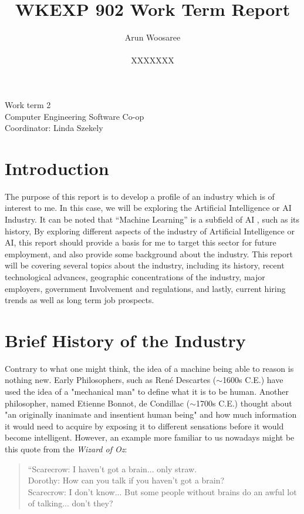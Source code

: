 \documentclass[letterpaper,12pt]{article}
\title{WKEXP 902 Work Term Report}
\author{Arun Woosaree \\ \\ XXXXXXX}
\begin{document}
\relax
\begin{titlepage}
 \maketitle
 \thispagestyle{empty} %
 \centering
 \large
 \vspace{1cm}
 Work term 2\\
 \vspace{1cm}
 Computer Engineering Software Co-op \\
 \vspace{1cm}
 Coordinator: Linda Szekely
\end{titlepage}

\section{Introduction}
The purpose of this report is to develop a profile of an industry which is of interest to me.
In this case, we will be exploring the Artificial Intelligence or AI Industry.
It can be noted that ``Machine Learning'' is a subfield of AI \cite{sasAIvsML}, such as its history, 
By exploring different aspects of the industry of Artificial Intelligence or AI, this report should
provide a basis for me to target this sector for future employment, and
also provide some background about the industry.
This report will be covering several topics about the industry,
including its history, recent technological advances, geographic
concentrations of the industry, major employers, government Involvement
and regulations, and lastly, current hiring trends as well as
long term job prospects.


\section{Brief History of the Industry}
Contrary to what one might think, the idea of a machine being able to reason is nothing new. 
Early Philosophers, such as René Descartes ($\sim$1600s C.E.) have used the idea of a "mechanical man"
to define what it is to be human.\cite{briefhistory}\cite{sep-descartes}
Another philosopher, named Etienne Bonnot, de Condillac\cite{briefhistory} ($\sim$1700s C.E.)
thought about "an originally inanimate and insentient human being"\cite{sep-condillac}
and how much information it would need to acquire by exposing it to different sensations
before it would become intelligent. However, an example more familiar to us nowadays
might be this quote from the \textit{Wizard of Oz}\cite{wizardofoz}:
\begin{quotation}
    \noindent“Scarecrow: I haven't got a brain... only straw.\\
    Dorothy: How can you talk if you haven't got a brain?\\
    Scarecrow: I don't know... But some people without brains do an awful lot of talking... don't they?\\
\end{quotation}
\end{document}
